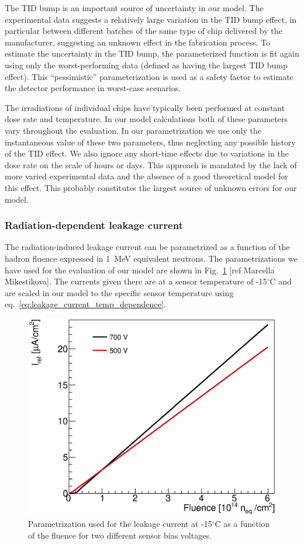 The TID bump is an important source of uncertainty in our model. The experimental data suggests
a relatively large variation in the TID bump effect, in particular
between different batches of the same type of chip delivered by the manufacturer, suggesting an unknown
effect in the fabrication process. To estimate the uncertainty in the TID bump,
the parameterized function is fit again using only the worst-performing data (defined as having the
largest TID bump effect). This ``pessimistic'' parameterization is used as a safety factor to estimate
the detector performance in worst-case scenarios.

The irradiations of individual chips have typically been performed at constant dose rate and temperature. In our model calculations both of these parameters vary throughout the evaluation. In our parametrization we use only the instantaneous value of these two parameters, thus neglecting any possible history of the TID effect. We also ignore any short-time effects due to variations in the dose rate on the scale of hours or days. This approach is mandated by the lack of more varied experimental data and the absence of a good theoretical model for this effect. This probably constitutes the largest source of unknown errors for our model.

\subsubsection{Radiation-dependent leakage current}

The radiation-induced leakage current can be parametrized as a function of the hadron fluence expressed in 1~MeV equivalent neutrons. The parametrizations we have used for the evaluation of our model are shown in Fig.~\ref{fig:leakage} [ref Marcella Mikestikova]. The currents given there are at a sensor temperature of -15$^\circ$C and are scaled in our model to the specific sensor temperature using eq.~\ref{eq:leakage_current_temp_dependence}. 

\begin{figure}[ht]
\centering
\includegraphics[width=0.5\linewidth]{figures/SensorLeakagePower.eps}
\caption{Parametrization used for the leakage current at -15$^\circ$C as a function of the fluence for two different sensor bias voltages.}
\label{fig:leakage}
\end{figure}






